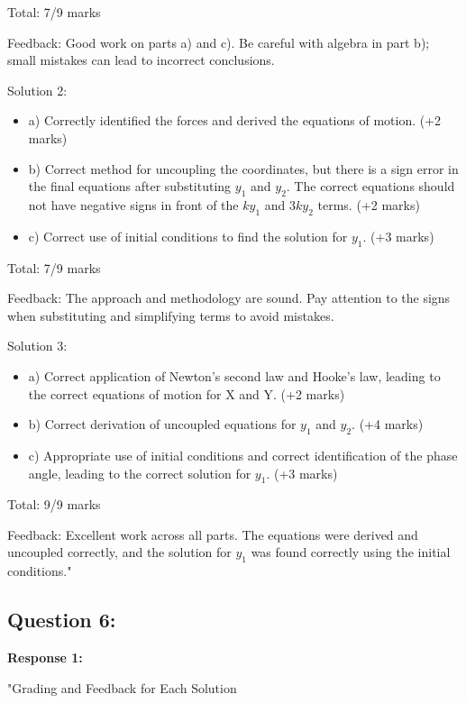 \documentclass[a4paper,11pt]{article}
\begin{document}
Total: 7/9 marks

Feedback: Good work on parts a) and c). Be careful with algebra in part b); small mistakes can lead to incorrect conclusions.

Solution 2:

\begin{itemize}
    \item a) Correctly identified the forces and derived the equations of motion. (+2 marks)
    \item b) Correct method for uncoupling the coordinates, but there is a sign error in the final equations after substituting \( y_1 \) and \( y_2 \). The correct equations should not have negative signs in front of the \( ky_1 \) and \( 3ky_2 \) terms. (+2 marks)
    \item c) Correct use of initial conditions to find the solution for \( y_1 \). (+3 marks)
\end{itemize}

Total: 7/9 marks

Feedback: The approach and methodology are sound. Pay attention to the signs when substituting and simplifying terms to avoid mistakes.

Solution 3:

\begin{itemize}
    \item a) Correct application of Newton's second law and Hooke's law, leading to the correct equations of motion for X and Y. (+2 marks)
    \item b) Correct derivation of uncoupled equations for \( y_1 \) and \( y_2 \). (+4 marks)
    \item c) Appropriate use of initial conditions and correct identification of the phase angle, leading to the correct solution for \( y_1 \). (+3 marks)
\end{itemize}

Total: 9/9 marks

Feedback: Excellent work across all parts. The equations were derived and uncoupled correctly, and the solution for \( y_1 \) was found correctly using the initial conditions."

\subsection*{Question 6:}

\textbf{Response 1:}

"Grading and Feedback for Each Solution
\end{document}
